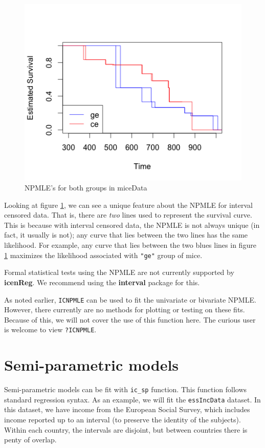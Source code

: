 \documentclass[11pt]{report}
\begin{document}
  \begin{figure}
  \centerline{\includegraphics{MICE_NPMLES.png}}
  \caption[MICE NPMLE]{NPMLE's for both groups in miceData} 
  \label{figure:MICE}
  \end{figure}

  Looking at figure \ref{figure:MICE}, we can see a unique feature about the NPMLE for 
  interval censored data. That is, there are \emph{two} lines used to represent
  the survival curve. This is because with interval censored data, the NPMLE
  is not always unique (in fact, it usually is not); any curve that lies between
  the two lines has the same likelihood. For example, any curve that lies between
  the two blues lines in figure \ref{figure:MICE} maximizes the likelihood 
  associated with \texttt{"ge"} group of mice. 

  Formal statistical tests using the NPMLE are not currently supported by 
{\bf icenReg}. We recommend using the {\bf interval} package for this. 

  As noted earlier, \texttt{ICNPMLE} can be used to fit the univariate
  or bivariate NPMLE. However, there currently are no methods for plotting
  or testing on these fits. Because of this, we will not cover the use of this
  function here. The curious user is welcome to view \texttt{?ICNPMLE}.

  \section{Semi-parametric models}

  Semi-parametric models can be fit with \texttt{ic\_sp} function. This function
  follows standard regression syntax. As an example, we will fit the 
  \texttt{essIncData} dataset. In this dataset, we have income from the European
  Social Survey, which includes income reported up to an interval (to preserve
  the identity of the subjects). Within each country, the intervals are disjoint,
  but between countries there is penty of overlap. 
  
\end{document}
